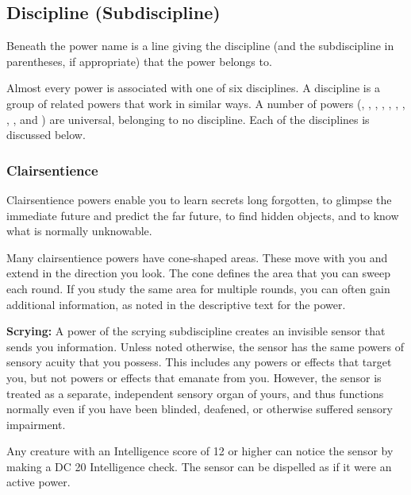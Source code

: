 \subsection{Discipline (Subdiscipline)}
Beneath the power name is a line giving the discipline (and the subdiscipline in parentheses, if appropriate) that the power belongs to.

Almost every power is associated with one of six disciplines. A discipline is a group of related powers that work in similar ways. A number of powers (, , , , , , , , , and ) are universal, belonging to no discipline. Each of the disciplines is discussed below.

\subsubsection{Clairsentience}
Clairsentience powers enable you to learn secrets long forgotten, to glimpse the immediate future and predict the far future, to find hidden objects, and to know what is normally unknowable.


Many clairsentience powers have cone-shaped areas. These move with you and extend in the direction you look. The cone defines the area that you can sweep each round. If you study the same area for multiple rounds, you can often gain additional information, as noted in the descriptive text for the power.

\textbf{Scrying:} A power of the scrying subdiscipline creates an invisible sensor that sends you information. Unless noted otherwise, the sensor has the same powers of sensory acuity that you possess. This includes any powers or effects that target you, but not powers or effects that emanate from you. However, the sensor is treated as a separate, independent sensory organ of yours, and thus functions normally even if you have been blinded, deafened, or otherwise suffered sensory impairment.

Any creature with an Intelligence score of 12 or higher can notice the sensor by making a DC 20 Intelligence check. The sensor can be dispelled as if it were an active power.

